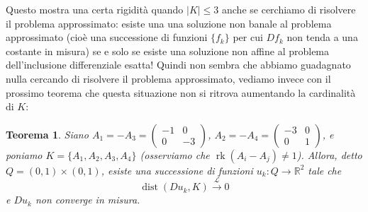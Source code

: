 \documentclass[a4paper,11pt]{book}
\theoremstyle{plain}
\newtheorem{teo}{Teorema}[chapter]
\theoremstyle{definition}
\theoremstyle{remark}
\newcommand{\R}{\mathbb{R}}
\newcommand{\LL}{\mathscr{L}}
\DeclareMathOperator{\rk}{rk}
\DeclareMathOperator{\dist}{dist}
\begin{document}
Questo mostra una certa rigidità quando $|K|\leq 3$ anche se cerchiamo di risolvere il problema approssimato: esiste una una soluzione non banale al problema approssimato (cioè una successione di funzioni $\{f_{k}\}$ per cui $Df_{k}$ non tenda a una costante in misura) se e solo se esiste una soluzione non affine al problema dell'inclusione differenziale esatta! Quindi non sembra che abbiamo guadagnato nulla cercando di risolvere il problema approssimato, vediamo invece con il prossimo teorema che questa situazione non si ritrova aumentando la cardinalità di $K$:
\begin{teo}\label{teo:5}
	Siano $A_1=-A_3=\begin{pmatrix}
	                	-1 & 0\\
	                	0 & -3
	                \end{pmatrix}$, $A_2=-A_4=\begin{pmatrix}
	                	-3 & 0\\
	                	0 & 1
	                \end{pmatrix}$, e poniamo $K=\{A_1, A_2, A_3, A_4\}$ (osserviamo che $\rk(A_i-A_j)\neq 1$). Allora, detto $Q=(0,1)\times(0,1)$, esiste una successione di funzioni $u_k:Q\to\R^2$ tale che
	\[
		\dist(Du_k,K)\xrightarrow{\LL} 0
	\]
	e $Du_k$ non converge in misura.
\end{teo}
\end{document}
